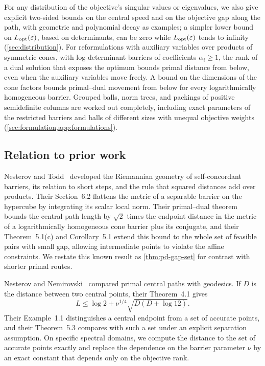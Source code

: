 For any distribution of the objective's singular values or eigenvalues,
we also give explicit two-sided bounds on the
central speed and on the objective gap along the path, with geometric
and polynomial decay as examples; a simpler lower bound on
$L_{\mathrm{opt}}(\varepsilon)$, based on determinants, can be zero while
$L_{\mathrm{opt}}(\varepsilon)$ tends to infinity (\cref{sec:distribution}). For
reformulations with auxiliary variables over products of symmetric
cones, with log-determinant barriers of coefficients $\alpha_i\geq1$,
the rank of a dual solution that exposes the optimum bounds primal
distance from below, even when the auxiliary variables move freely. A
bound on the dimensions of the cone factors bounds primal--dual movement
from below for every logarithmically homogeneous barrier. Grouped balls,
norm trees, and packings of positive semidefinite columns are worked out
completely, including exact parameters of the restricted barriers and
balls of different sizes with unequal objective weights
(\cref{sec:formulation,app:formulations}).

\subsection{Relation to prior work}
\label{subsec:geometric-prior}

Nesterov and Todd~\cite{NesterovTodd2002} developed the Riemannian
geometry of self-concordant barriers, its relation to short steps, and
the rule that squared distances add over products. Their Section~6.2
flattens the metric of a separable barrier on the hypercube by
integrating its scalar local norm. Their primal--dual theorem bounds the
central-path length by $\sqrt2$ times the endpoint distance in the
metric of a logarithmically homogeneous cone barrier plus its conjugate,
and their Theorem~5.1(c) and Corollary~5.1 extend this bound to
the whole set of feasible pairs with small gap, allowing intermediate
points to violate the affine constraints. We restate this known result
as \cref{thm:pd-gap-set} for contrast with shorter primal routes.

Nesterov and Nemirovski~\cite{NesterovNemirovski2008} compared primal
central paths with geodesics. If $D$ is the distance between two central
points, their Theorem~4.1 gives
\begin{equation}
 L\leq\log2+\nu^{1/4}\sqrt{D(D+\log12)}.
 \label{eq:NN-comparison}
\end{equation}
Their Example~1.1 distinguishes a central endpoint from a set of
accurate points, and their Theorem~5.3 compares with such a set under an
explicit separation assumption. On specific spectral domains, we
compute the distance to the set of accurate points exactly and replace
the dependence on the barrier parameter $\nu$ by an exact constant that
depends only on the objective rank.

